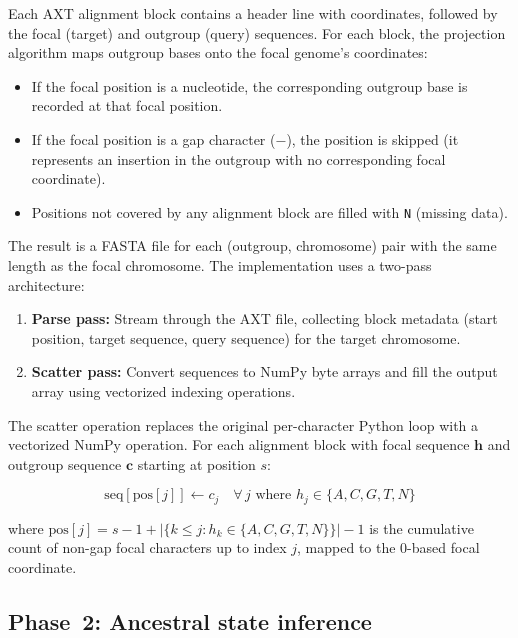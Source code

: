 \documentclass[11pt,a4paper]{article}
\begin{document}
Each AXT alignment block contains a header line with coordinates, followed by
the focal (target) and outgroup (query) sequences. For each block, the
projection algorithm maps outgroup bases onto the focal genome's coordinates:

\begin{itemize}
    \item If the focal position is a nucleotide, the corresponding outgroup
        base is recorded at that focal position.
    \item If the focal position is a gap character ($-$), the position is
        skipped (it represents an insertion in the outgroup with no
        corresponding focal coordinate).
    \item Positions not covered by any alignment block are filled with
        \texttt{N} (missing data).
\end{itemize}

The result is a FASTA file for each (outgroup, chromosome) pair with the same
length as the focal chromosome. The implementation uses a two-pass
architecture:

\begin{enumerate}
    \item \textbf{Parse pass:} Stream through the AXT file, collecting block
        metadata (start position, target sequence, query sequence) for the
        target chromosome.
    \item \textbf{Scatter pass:} Convert sequences to NumPy byte arrays and
        fill the output array using vectorized indexing operations.
\end{enumerate}

The scatter operation replaces the original per-character Python loop with a
vectorized NumPy operation. For each alignment block with focal sequence
$\mathbf{h}$ and outgroup sequence $\mathbf{c}$ starting at position $s$:

\begin{equation}
\label{eq:scatter}
\text{seq}[\text{pos}[j]] \leftarrow c_j \quad \forall\, j \text{ where } h_j \in \{A,C,G,T,N\}
\end{equation}

\noindent where $\text{pos}[j] = s - 1 + |\{k \le j : h_k \in \{A,C,G,T,N\}\}| - 1$
is the cumulative count of non-gap focal characters up to index $j$, mapped to
the 0-based focal coordinate.

\subsection{Phase~2: Ancestral state inference}
\label{sec:calling}
\end{document}
